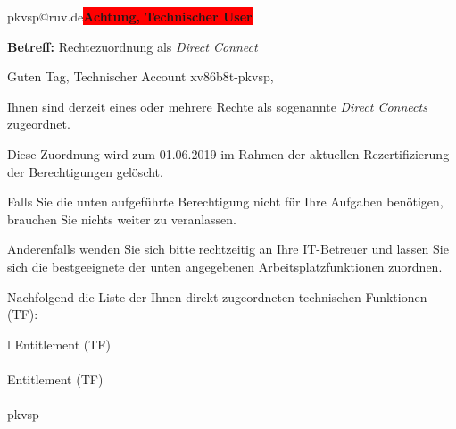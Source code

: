 \documentclass[a4paper,landscape,12pt]{letter}
\begin{document}
\begin{letter}{pkvsp@ruv.de\space\space\space\space\space\space\space\space\space\bfseries\colorbox{red}{Achtung, Technischer User}\hfill \break}
\begin{normalsize}
	\opening{\textbf{Betreff:} Rechtezuordnung als \emph{Direct Connect}}
	\begin{normalsize} \hfill
	\end{normalsize}

	\begin{normalsize}
		Guten Tag, 
	Technischer Account xv86b8t-pkvsp, \hfill \break
	\end{normalsize}
	\end{normalsize}
	
\begin{normalsize}
	Ihnen sind derzeit eines oder mehrere Rechte als sogenannte \emph{Direct Connects} zugeordnet.
	
	Diese Zuordnung wird zum 01.06.2019 im Rahmen der aktuellen Rezertifizierung der Berechtigungen gelöscht.
	
	Falls Sie die unten aufgeführte Berechtigung nicht für Ihre Aufgaben benötigen, 
	brauchen Sie nichts weiter zu veranlassen.
	
	Anderenfalls wenden Sie sich bitte rechtzeitig an Ihre IT-Betreuer 
	und lassen Sie sich die bestgeeignete der unten angegebenen Arbeitsplatzfunktionen zuordnen.
	\end{normalsize}
	
\begin{normalsize}
	Nachfolgend die Liste der Ihnen direkt zugeordneten technischen Funktionen (TF):

	\begin{longtable}{l}
		Entitlement (TF) \\ \hline
		\endfirsthead
		\\\hline
		Entitlement (TF) \\ \hline
		\endhead %
		\multicolumn{1}{r@{}}{Fortsetzung \ldots}\\
		\endfoot
		\hline
		\endlastfoot
	pkvsp\\
	\end{longtable}
	\end{normalsize}
	

\end{letter}
\end{document}
